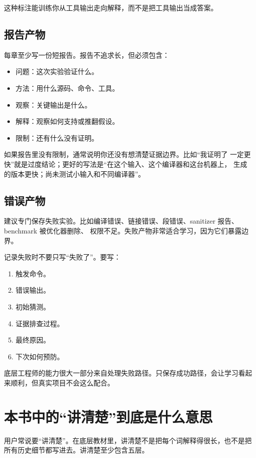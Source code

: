 这种标注能训练你从工具输出走向解释，而不是把工具输出当成答案。

\subsection{报告产物}

每章至少写一份短报告。报告不追求长，但必须包含：

\begin{itemize}
  \item 问题：这次实验验证什么。
  \item 方法：用什么源码、命令、工具。
  \item 观察：关键输出是什么。
  \item 解释：观察如何支持或推翻假设。
  \item 限制：还有什么没有证明。
\end{itemize}

如果报告里没有限制，通常说明你还没有想清楚证据边界。比如“我证明了  一定更快”就是过度结论；更好的写法是“在这个输入、这个编译器和这台机器上， 生成的版本更快；尚未测试小输入和不同编译器”。

\subsection{错误产物}

建议专门保存失败实验。比如编译错误、链接错误、段错误、sanitizer 报告、benchmark 被优化器删除、 权限不足。失败产物非常适合学习，因为它们暴露边界。

记录失败时不要只写“失败了”。要写：

\begin{enumerate}
  \item 触发命令。
  \item 错误输出。
  \item 初始猜测。
  \item 证据排查过程。
  \item 最终原因。
  \item 下次如何预防。
\end{enumerate}

底层工程师的能力很大一部分来自处理失败路径。只保存成功路径，会让学习看起来顺利，但真实项目不会这么配合。

\section{本书中的“讲清楚”到底是什么意思}

用户常说要“讲清楚”。在底层教材里，讲清楚不是把每个词解释得很长，也不是把所有历史细节都写进去。讲清楚至少包含五层。

